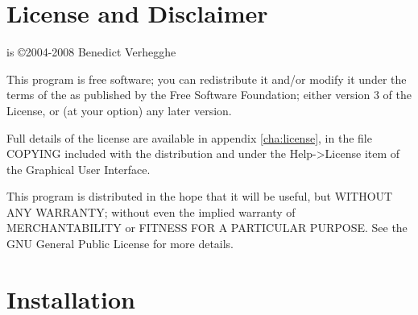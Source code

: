 
\section{License and Disclaimer}
\label{sec:license}
\pyformex is \copyright 2004-2008 Benedict Verhegghe

This program is free software; you can redistribute it and/or modify
it under the terms of the  as published by
the Free Software Foundation; either version 3 of the License, or
(at your option) any later version. 

Full details of the license are available in appendix \ref{cha:license}, in the file \textsf{COPYING} included with the distribution and under the Help->License item of the \pyformex Graphical User Interface. 

This program is distributed in the hope that it will be useful,
but WITHOUT ANY WARRANTY; without even the implied warranty of
MERCHANTABILITY or FITNESS FOR A PARTICULAR PURPOSE.  See the
GNU General Public License for more details.



\section{Installation}
\label{sec:installation}
